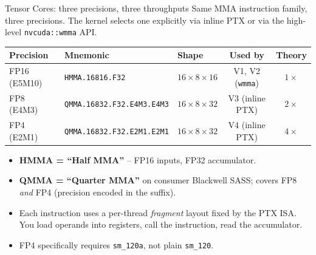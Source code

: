 \documentclass[10pt,aspectratio=169]{beamer}
\begin{document}
\begin{frame}{Tensor Cores: three precisions, three throughputs}
  Same MMA instruction family, three precisions. The kernel selects
  one explicitly via inline PTX or via the high-level
  \texttt{nvcuda::wmma} API.
  \vspace{0.4em}
  \begin{center}
  \begin{tabular}{l l l c c}
    \toprule
    \textbf{Precision} & \textbf{Mnemonic} & \textbf{Shape} & \textbf{Used by} & \textbf{Theory} \\
    \midrule
    FP16 (E5M10) & \texttt{HMMA.16816.F32} & $16{\times}8{\times}16$ & V1, V2 (\texttt{wmma}) & $1\times$ \\
    FP8 (E4M3)   & \texttt{QMMA.16832.F32.E4M3.E4M3} & $16{\times}8{\times}32$ & V3 (inline PTX) & $2\times$ \\
    FP4 (E2M1)   & \texttt{QMMA.16832.F32.E2M1.E2M1} & $16{\times}8{\times}32$ & V4 (inline PTX) & $4\times$ \\
    \bottomrule
  \end{tabular}
  \end{center}
  \vspace{0.4em}
  \begin{itemize}
    \item \textbf{HMMA = ``Half MMA''} -- FP16 inputs, FP32 accumulator.
    \item \textbf{QMMA = ``Quarter MMA''} on consumer Blackwell SASS;
          covers FP8 \emph{and} FP4 (precision encoded in the suffix).
    \item Each instruction uses a per-thread \emph{fragment} layout
          fixed by the PTX ISA. You load operands into registers, call
          the instruction, read the accumulator.
    \item FP4 specifically requires \texttt{sm\_120a}, not plain
          \texttt{sm\_120}.
  \end{itemize}
\end{frame}
\end{document}
